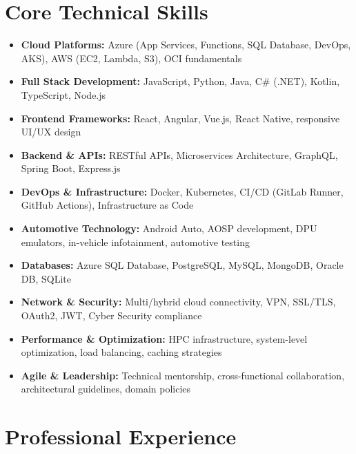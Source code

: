 \documentclass[11pt,a4paper]{article}
\begin{document}
\section*{Core Technical Skills}
\begin{itemize}[noitemsep]
\item \textbf{Cloud Platforms:} Azure (App Services, Functions, SQL Database, DevOps, AKS), AWS (EC2, Lambda, S3), OCI fundamentals
\item \textbf{Full Stack Development:} JavaScript, Python, Java, C\# (.NET), Kotlin, TypeScript, Node.js
\item \textbf{Frontend Frameworks:} React, Angular, Vue.js, React Native, responsive UI/UX design
\item \textbf{Backend \& APIs:} RESTful APIs, Microservices Architecture, GraphQL, Spring Boot, Express.js
\item \textbf{DevOps \& Infrastructure:} Docker, Kubernetes, CI/CD (GitLab Runner, GitHub Actions), Infrastructure as Code
\item \textbf{Automotive Technology:} Android Auto, AOSP development, DPU emulators, in-vehicle infotainment, automotive testing
\item \textbf{Databases:} Azure SQL Database, PostgreSQL, MySQL, MongoDB, Oracle DB, SQLite
\item \textbf{Network \& Security:} Multi/hybrid cloud connectivity, VPN, SSL/TLS, OAuth2, JWT, Cyber Security compliance
\item \textbf{Performance \& Optimization:} HPC infrastructure, system-level optimization, load balancing, caching strategies
\item \textbf{Agile \& Leadership:} Technical mentorship, cross-functional collaboration, architectural guidelines, domain policies
\end{itemize}

\section*{Professional Experience}
\end{document}
